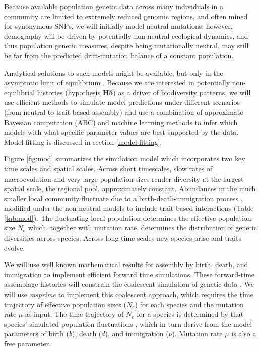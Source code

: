 \documentclass[11pt]{article}
\begin{document}
Because available population genetic data across many individuals in a
community are limited to extremely reduced genomic regions, and often
mined for synonymous SNPs, we will initially model neutral mutations;
however, demography will be driven by potentially non-neutral ecological
dynamics, and thus population genetic measures, despite being
mutationally neutral, may still be far from the predicted drift-mutation
balance of a constant population.

Analytical solutions to such models might be available, but only in
the asymptotic limit of equilibrium \citep[e.g.,][]{Etienne2007-we,
  Rosindell2015-gp}. Because we are interested in potentially
non-equilibrial histories (hypothesis \textbf{H5}) as a driver of
biodiversity patterns, we will use efficient methods to simulate model
predictions under different scenarios (from neutral to trait-based
assembly) and use a combination of approximate Bayesian computation
(ABC) and machine learning methods to infer which models with what
specific parameter values are best supported by the data. Model
fitting is discussed in section \ref{model-fitting}.

Figure \ref{fig:mod} summarizes the simulation model which
incorporates two key time scales and spatial scales. Across short
timescales, slow rates of macroevolution and very large population
sizes render diversity at the largest spatial scale, the regional
pool, approximately constant. Abundances in the much smaller local
community fluctuate due to a birth-death-immigration process
\cite{Kendall1948-ri}, modified under the non-neutral models to
include trait-based interactions (Table \ref{tab:mod}).  The
fluctuating local population determines the effective population size
$N_e$ which, together with mutation rate, determines the distribution
of genetic diversities across species. Across long time scales new
species arise and traits evolve.

We will use well known mathematical results for assembly by birth,
death, and immigration \cite{Haegeman2017-kf,Kendall1948-ri} to
implement efficient forward time simulations.  These forward-time
assemblage histories will constrain the coalescent simulation of
genetic data \cite{Rosenberg2002-vb, waples2007}. We will use {\it
  msprime} \cite{Kelleher2016-an} to implement this coalescent
approach, which requires the time trajectory of effective population
sizes ($N_e$) for each species and the mutation rate $\mu$ as
input. The time trajectory of $N_e$ for a species is determined by
that species' simulated population fluctuations \cite{waples2007},
which in turn derive from the model parameters of birth ($b$), death
($d$), and immigration ($\nu$).  Mutation rate $\mu$ is also a free
parameter.
\end{document}
